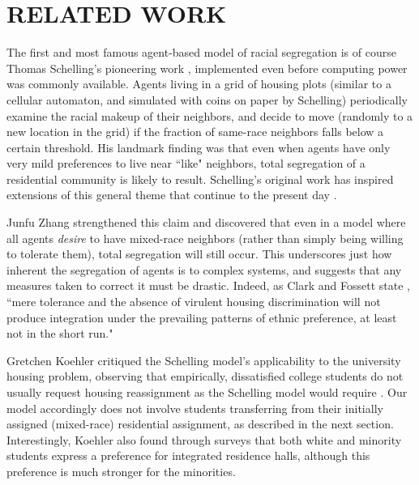 
\section{RELATED WORK}
\label{sec:related}

The first and most famous agent-based model of racial segregation is of course
Thomas Schelling's pioneering work \cite{schelling_models_1969}, implemented
even before computing power was commonly available. Agents living in a grid of
housing plots (similar to a cellular automaton, and simulated with coins on
paper by Schelling) periodically examine the racial makeup of their neighbors,
and decide to move (randomly to a new location in the grid) if the fraction of
same-race neighbors falls below a certain threshold. His landmark finding was
that even when agents have only very mild preferences to live near ``like"
neighbors, total segregation of a residential community is likely to result.
Schelling's original work has inspired extensions of this general theme that
continue to the present day \cite[to name just a
few]{laurie_role_2003,chen_emergence_2005,collard_emergence_2013,pate_segregation_2010,yin_dynamics_2009,fossett_overlooked_2005,abbas_agent-based_2013}.

Junfu Zhang \citeyear{zhang_evolutionary_2002} strengthened this claim and
discovered that even in a model where all agents \textit{desire} to have
mixed-race neighbors (rather than simply being willing to tolerate them),
total segregation will still occur. This underscores just how inherent the
segregation of agents is to complex systems, and suggests that any measures
taken to correct it must be drastic. Indeed, as Clark and Fossett state
\citeyear{clark_understanding_2008}, ``mere tolerance and the absence of
virulent housing discrimination will not produce integration under the
prevailing patterns of ethnic preference, at least not in the short run."

Gretchen Koehler \citeyear{koehler_racial_2001} critiqued the Schelling
model's applicability to the university housing problem, observing that
empirically, dissatisfied college students do not usually request housing
reassignment as the Schelling model would require
\cite{koehler_residential_2010}. Our model accordingly does not involve
students transferring from their initially assigned (mixed-race) residential
assignment, as described in the next section. Interestingly, Koehler also
found through surveys that both white and minority students express a
preference for integrated residence halls, although this preference is much
stronger for the minorities.

